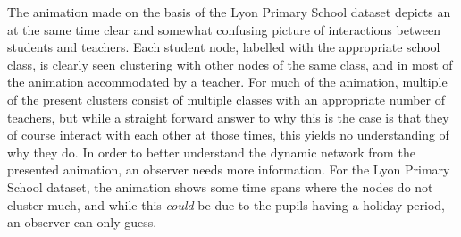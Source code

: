 The animation made on the basis of the Lyon Primary School dataset depicts an at the same time clear and somewhat confusing picture of interactions between students and teachers.
Each student node, labelled with the appropriate school class, is clearly seen clustering with other nodes of the same class, and in most of the animation accommodated by a teacher.
For much of the animation, multiple of the present clusters consist of multiple classes with an appropriate number of teachers, but while a straight forward answer to why this is the case is that they of course interact with each other at those times, this yields no understanding of why they do.
In order to better understand the dynamic network from the presented animation, an observer needs more information.
For the Lyon Primary School dataset, the animation shows some time spans where the nodes do not cluster much, and while this \textit{could} be due to the pupils having a holiday period, an observer can only guess.







